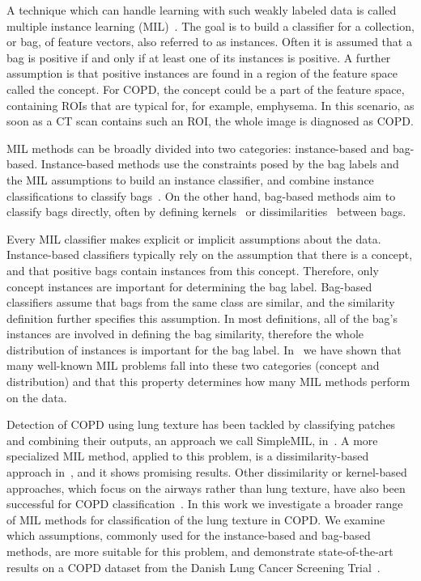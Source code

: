 \documentclass[10pt,conference,a4paper]{IEEEtran}
\begin{document}
A technique which can handle learning with such weakly labeled data is called multiple instance learning (MIL)~\cite{dietterich1997solving,maron1998framework}. The goal is to build a classifier for a collection, or bag, of feature vectors, also referred to as instances. Often it is assumed that a bag is positive if and only if at least one of its instances is positive. A further assumption is that positive instances are found in a region of the feature space called the concept. For COPD, the concept could be a part of the feature space, containing ROIs that are typical for, for example, emphysema. In this scenario, as soon as a CT scan contains such an ROI, the whole image is diagnosed as COPD.

MIL methods can be broadly divided into two categories: instance-based and bag-based. Instance-based methods use the constraints posed by the bag labels and the MIL assumptions to build an instance classifier, and combine instance classifications to classify bags~\cite{maron1998framework,zhang2001dd,andrews2002support,viola2006multiple}. On the other hand, bag-based methods aim to classify bags directly, often by defining kernels~\cite{gartner2002multi} or dissimilarities~\cite{tax2011bag,zhang2009multi2} between bags.

Every MIL classifier makes explicit or implicit assumptions about the data. Instance-based classifiers typically rely on the assumption that there is a concept, and that positive bags contain instances from this concept. Therefore, only concept instances are important for determining the bag label. Bag-based classifiers assume that bags from the same class are similar, and the similarity definition further specifies this assumption. In most definitions, all of the bag's instances are involved in defining the bag similarity, therefore the whole distribution of instances is important for the bag label. In~\cite{cheplygina2012does} we have shown that many well-known MIL problems fall into these two categories (concept and distribution) and that this property determines how many MIL methods perform on the data.

Detection of COPD using lung texture has been tackled by classifying patches and combining their outputs, an approach we call SimpleMIL, in~\cite{sorensen2012texture}. A more specialized MIL method, applied to this problem, is a dissimilarity-based approach in~\cite{sorensen2010image}, and it shows promising results. Other dissimilarity or kernel-based approaches, which focus on the airways rather than lung texture, have also been successful for COPD classification~\cite{sorensen2011dissimilarity,feragen2013geometric}. In this work we investigate a broader range of MIL methods for classification of the lung texture in COPD. We examine which assumptions, commonly used for the instance-based and bag-based methods, are more suitable for this problem, and demonstrate state-of-the-art results on a COPD dataset from the Danish Lung Cancer Screening Trial~\cite{pedersen2009danish}.
\end{document}
